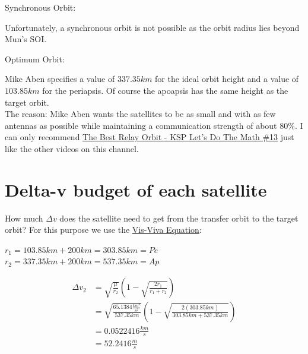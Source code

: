 \documentclass[12pt,paper=A4,numbers=noenddot,bibliography=totoc,listof=totoc,DIV=11,BCOR=1mm]{scrreprt}
\begin{document}
\begin{flushleft}
Synchronous Orbit:
\end{flushleft}
Unfortunately, a synchronous orbit is not possible as the orbit radius lies beyond Mun's SOI.

\begin{flushleft}
Optimum Orbit:
\end{flushleft}
Mike Aben specifies a value of $337.35km$ for the ideal orbit height and a value of $103.85km$ for the periapsis. Of course the apoapsis has the same height as the target orbit.\\
The reason: Mike Aben wants the satellites to be as small and with as few antennas as possible while maintaining a communication strength of about 80\%.
I can only recommend \href{https://youtu.be/gpQmvwU1x8c}{The Best Relay Orbit - KSP Let's Do The Math \#13} just like the other videos on this channel.

\section{Delta-v budget of each satellite}
How much $\Delta v$ does the satellite need to get from the transfer orbit to the target orbit?
For this purpose we use the \hyperlink{visviva}{Vis-Viva Equation}:
\begin{flushright}
$r_{1} = 103.85km + 200km = 303.85km = Pe$ \\
$r_{2} = 337.35km + 200km = 537.35km = Ap$
\end{flushright}
\begin{equation*}
\begin{split}
\Delta v_{2} &= \sqrt{\frac{\mu}{r_{2}}} \left( 1-\sqrt{\frac{2r_{1}}{r_{1}+r_{2}}} \right) \\
             &= \sqrt{\frac{65.1384 \frac{km^{3}}{s^{2}}}{537.35km}} \left( 1-\sqrt{\frac{2(303.85km)}{303.85km+537.35km}} \right) \\
             &= 0.0522416\frac{km}{s} \\
             &= 52.2416\frac{m}{s}
\end{split}
\end{equation*}
\end{document}

